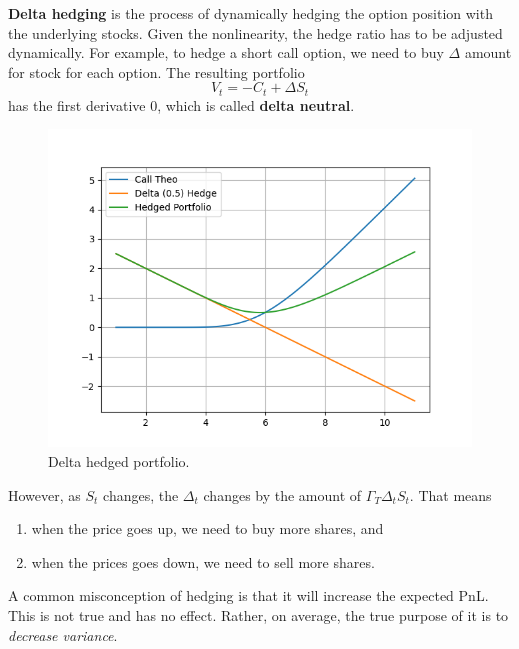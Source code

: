 \documentclass{article}
\begin{document}
    \begin{definition}
      \textbf{Delta hedging} is the process of dynamically hedging the option position with the underlying stocks. Given the nonlinearity, the hedge ratio has to be adjusted dynamically. For example, to hedge a short call option, we need to buy $\Delta$ amount for stock for each option. The resulting portfolio 
      \begin{equation}
        V_t = -C_t + \Delta S_t
      \end{equation}
      has the first derivative $0$, which is called \textbf{delta neutral}. 

      \begin{figure}[H]
        \centering 
        \includegraphics[scale=0.4]{img/delta_hedge.png}
        \caption{Delta hedged portfolio.} 
        \label{fig:delta_hedge}
      \end{figure}

      However, as $S_t$ changes, the $\Delta_t$ changes by the amount of $\Gamma_T \Delta_t S_t$. That means 
      \begin{enumerate}
        \item when the price goes up, we need to buy more shares, and 
        \item when the prices goes down, we need to sell more shares. 
      \end{enumerate}
    \end{definition}

    A common misconception of hedging is that it will increase the expected PnL. This is not true and has no effect. Rather, on average, the true purpose of it is to \textit{decrease variance}.
\end{document}
